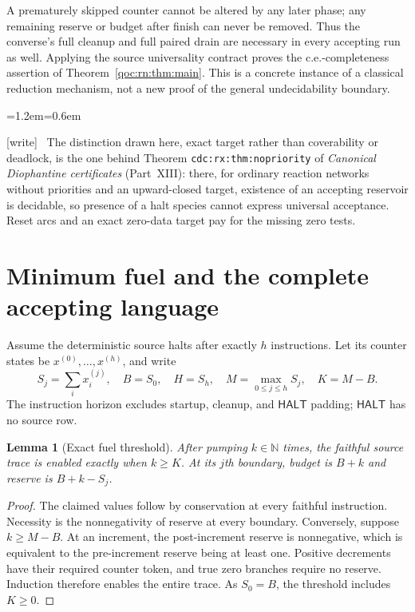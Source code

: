 \documentclass[11pt,letterpaper]{article}
\newtheorem{lemma}[theorem]{Lemma}
\theoremstyle{definition}
\theoremstyle{remark}
\newcommand{\N}{\mathbb N}
\newcommand{\HALT}{\mathsf{HALT}}
\newcommand{\wtag}{\textup{[write]}}
\newenvironment{writenote}{\par\smallskip\begin{list}{}{\leftmargin=1.2em\rightmargin=0.6em}\item[]\small\wtag\ }{\end{list}\smallskip}
\newcommand{\lab}[1]{\nolinkurl{#1}}
\begin{document}
A prematurely skipped counter cannot be altered by any later phase; any remaining reserve or budget after finish can never be removed. Thus the converse's full cleanup and full paired drain are necessary in every accepting run as well. Applying the source universality contract proves the c.e.-completeness assertion of Theorem~\ref{qoc:rn:thm:main}. This is a concrete instance of a classical reduction mechanism, not a new proof of the general undecidability boundary.

\begin{writenote}
The distinction drawn here, exact target rather than coverability or deadlock, is the one behind Theorem \lab{cdc:rx:thm:nopriority} of \emph{Canonical Diophantine certificates} (Part~XIII): there, for ordinary reaction networks without priorities and an upward-closed target, existence of an accepting reservoir is decidable, so presence of a halt species cannot express universal acceptance. Reset arcs and an exact zero-data target pay for the missing zero tests.
\end{writenote}


\section{Minimum fuel and the complete accepting language}
\label{qoc:rn:sec:lengths}
Assume the deterministic source halts after exactly $h$ instructions. Let its counter states be $x^{(0)},\ldots,x^{(h)}$, and write
\[
 S_j=\sum_i x_i^{(j)},\quad B=S_0,\quad H=S_h,\quad
 M=\max_{0\leq j\leq h}S_j,\quad K=M-B.
\]
The instruction horizon excludes startup, cleanup, and $\HALT$ padding; $\HALT$ has no source row.

\begin{lemma}[Exact fuel threshold]
\label{qoc:rn:lem:fuel}
After pumping $k\in\N$ times, the faithful source trace is enabled exactly when $k\geq K$. At its $j$th boundary, budget is $B+k$ and reserve is $B+k-S_j$.
\end{lemma}
\begin{proof}
The claimed values follow by conservation at every faithful instruction. Necessity is the nonnegativity of reserve at every boundary. Conversely, suppose $k\geq M-B$. At an increment, the post-increment reserve is nonnegative, which is equivalent to the pre-increment reserve being at least one. Positive decrements have their required counter token, and true zero branches require no reserve. Induction therefore enables the entire trace. As $S_0=B$, the threshold includes $K\geq0$.
\end{proof}
\end{document}
